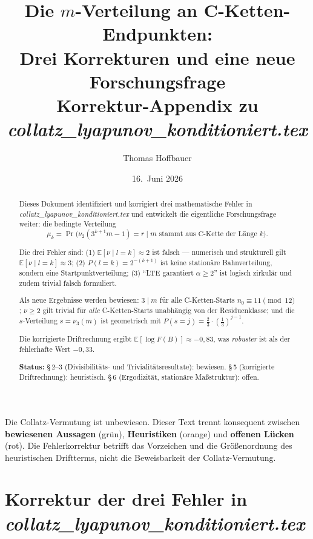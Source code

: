 \documentclass[12pt,a4paper]{article}
\title{%
  Die $m$-Verteilung an C-Ketten-Endpunkten:\\[0.3em]
  Drei Korrekturen und eine neue Forschungsfrage\\[0.5em]
  \large Korrektur-Appendix zu \textit{collatz\_lyapunov\_konditioniert.tex}%
}
\author{Thomas Hoffbauer}
\date{16.\ Juni 2026}
\newcommand{\vii}{\nu_2}
\newcommand{\viii}{\nu_3}
\newcommand{\E}{\mathbb{E}}
\newcommand{\logF}{\log F(B)}
\begin{document}
\maketitle

\begin{abstract}
Dieses Dokument identifiziert und korrigiert drei mathematische Fehler in
\textit{collatz\_lyapunov\_konditioniert.tex} und entwickelt die eigentliche
Forschungsfrage weiter: die bedingte Verteilung
\[
  \mu_k = \Pr\!\bigl(\vii(3^{k+1}m-1) = r \;\big|\; m \text{ stammt aus C-Kette der Länge } k\bigr).
\]

Die drei Fehler sind: (1) $\E[\nu \mid l{=}k] \approx 2$ ist falsch ---
numerisch und strukturell gilt $\E[\nu \mid l{=}k] \approx 3$;
(2) $P(l{=}k) = 2^{-(k+1)}$ ist keine stationäre Bahnverteilung,
sondern eine Startpunktverteilung; (3) ``LTE garantiert $\alpha \geq 2$'' ist
logisch zirkulär und zudem trivial falsch formuliert.

Als neue Ergebnisse werden bewiesen: $3 \mid m$ für alle C-Ketten-Starts
$n_0 \equiv 11 \pmod{12}$; $\nu \geq 2$ gilt trivial für \emph{alle}
C-Ketten-Starts unabhängig von der Residuenklasse; und die $s$-Verteilung
$s = \viii(m)$ ist geometrisch mit $P(s{=}j) = \tfrac{2}{3} \cdot \left(\tfrac{1}{3}\right)^{j-1}$.

Die korrigierte Driftrechnung ergibt $\E[\logF] \approx -0{,}83$, was
\emph{robuster} ist als der fehlerhafte Wert $-0{,}33$.

\medskip
\noindent\textbf{Status:}
\textcolor{bewiesengrün}{§\,2--3 (Divisibilitäts- und Trivialitätsresultate): bewiesen.}
\textcolor{warnorange}{§\,5 (korrigierte Driftrechnung): heuristisch.}
\textcolor{lückenrot}{§\,6 (Ergodizität, stationäre Maßstruktur): offen.}
\end{abstract}

\tableofcontents
\bigskip

\begin{tcolorbox}[warnung, title={Einordnung dieses Dokuments}]
Die Collatz-Vermutung ist unbewiesen.
Dieser Text trennt konsequent zwischen
\textbf{bewiesenen Aussagen} (grün),
\textbf{Heuristiken} (orange)
und \textbf{offenen Lücken} (rot).
Die Fehlerkorrektur betrifft das Vorzeichen und die Größenordnung
des heuristischen Driftterms, nicht die Beweisbarkeit der Collatz-Vermutung.
\end{tcolorbox}

\section{Korrektur der drei Fehler in \textit{collatz\_lyapunov\_konditioniert.tex}}
\label{sec:korrekturen}
\end{document}

